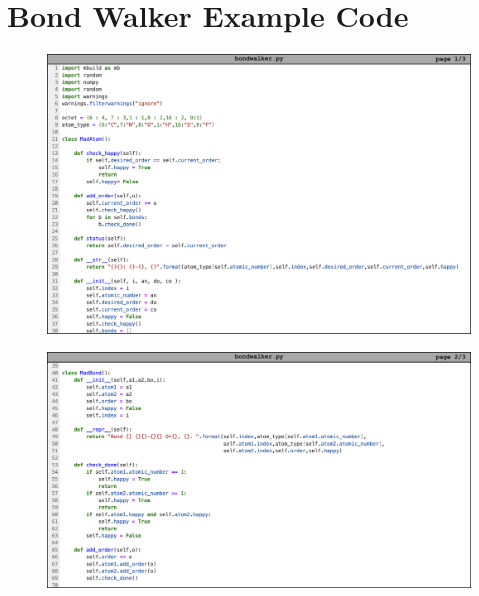 \chapter{Bond Walker Example Code}
\label{app:bond_walker_code}

\begin{figure}
    \centering
    \includegraphics[width=1\linewidth]{src/figures/FF_figs/bw1.png}
    \label{fig:bw1}
\end{figure}


\begin{figure}
    \centering
    \includegraphics[width=1\linewidth]{src/figures/FF_figs/bw2.png}
    \label{fig:bw2}
\end{figure}


